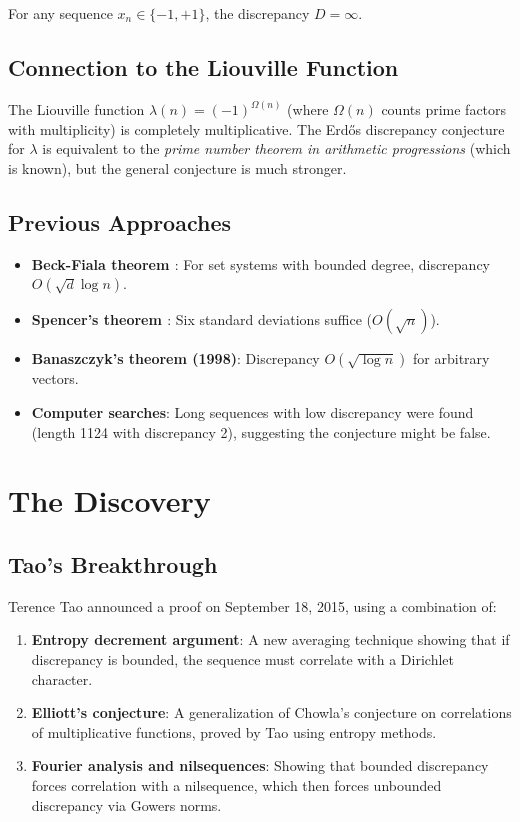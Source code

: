 \begin{conjecture}
For any sequence $x_n \in \{-1, +1\}$, the discrepancy $D = \infty$.
\end{conjecture}

\subsection{Connection to the Liouville Function}
The Liouville function $\lambda(n) = (-1)^{\Omega(n)}$ (where $\Omega(n)$ counts prime factors with multiplicity) is completely multiplicative. The Erdős discrepancy conjecture for $\lambda$ is equivalent to the \emph{prime number theorem in arithmetic progressions} (which is known), but the general conjecture is much stronger.

\subsection{Previous Approaches}
\begin{itemize}
\item \textbf{Beck-Fiala theorem \cite{beckfiala1981}}: For set systems with bounded degree, discrepancy $O(\sqrt{d} \log n)$.
\item \textbf{Spencer's theorem \cite{spencer1985}}: Six standard deviations suffice ($O(\sqrt{n})$).
\item \textbf{Banaszczyk's theorem (1998)}: Discrepancy $O(\sqrt{\log n})$ for arbitrary vectors.
\item \textbf{Computer searches}: Long sequences with low discrepancy were found (length 1124 with discrepancy 2), suggesting the conjecture might be false.
\end{itemize}

\section{The Discovery}

\subsection{Tao's Breakthrough \cite{tao2016discrepancy}}
Terence Tao announced a proof on September 18, 2015, using a combination of:

\begin{enumerate}
\item \textbf{Entropy decrement argument}: A new averaging technique showing that if discrepancy is bounded, the sequence must correlate with a Dirichlet character.
\item \textbf{Elliott's conjecture}: A generalization of Chowla's conjecture on correlations of multiplicative functions, proved by Tao using entropy methods.
\item \textbf{Fourier analysis and nilsequences}: Showing that bounded discrepancy forces correlation with a nilsequence, which then forces unbounded discrepancy via Gowers norms.
\end{enumerate}

